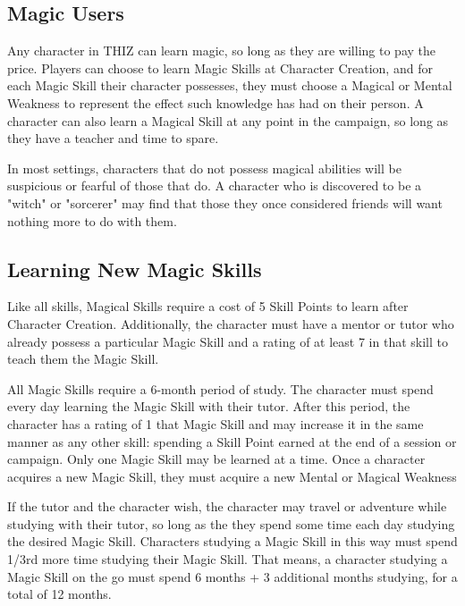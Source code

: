\documentclass[oneside]{book}
\begin{document}
\begin{multicols}{2}
\subsection{Magic Users}
Any character in THIZ can learn magic, so long as they are willing to pay the price. Players can choose to learn Magic Skills at Character Creation, and for each Magic Skill their character possesses, they must choose a Magical or Mental Weakness to represent the effect such knowledge has had on their person. A character can also learn a Magical Skill at any point in the campaign, so long as they have a teacher and time to spare. 

In most settings, characters that do not possess magical abilities will be suspicious or fearful of those that do. A character who is discovered to be a "witch" or "sorcerer" may find that those they once considered friends will want nothing more to do with them.

\subsection{Learning New Magic Skills}
Like all skills, Magical Skills require a cost of 5 Skill Points to learn after Character Creation. Additionally, the character must have a mentor or tutor who already possess a particular Magic Skill and a rating of at least 7 in that skill to teach them the Magic Skill.

All Magic Skills require a 6-month period of study. The character must spend every day learning the Magic Skill with their tutor. After this period, the character has a rating of 1 that Magic Skill and may increase it in the same manner as any other skill: spending a Skill Point earned at the end of a session or campaign. Only one Magic Skill may be learned at a time. Once a character acquires a new Magic Skill, they must acquire a new Mental or Magical Weakness

If the tutor and the character wish, the character may travel or adventure while studying with their tutor, so long as the they spend some time each day studying the desired Magic Skill. Characters studying a Magic Skill in this way must spend 1/3rd more time studying their Magic Skill. That means, a character studying a Magic Skill on the go must spend 6 months + 3 additional months studying, for a total of 12 months. 


\end{multicols}
\end{document}
